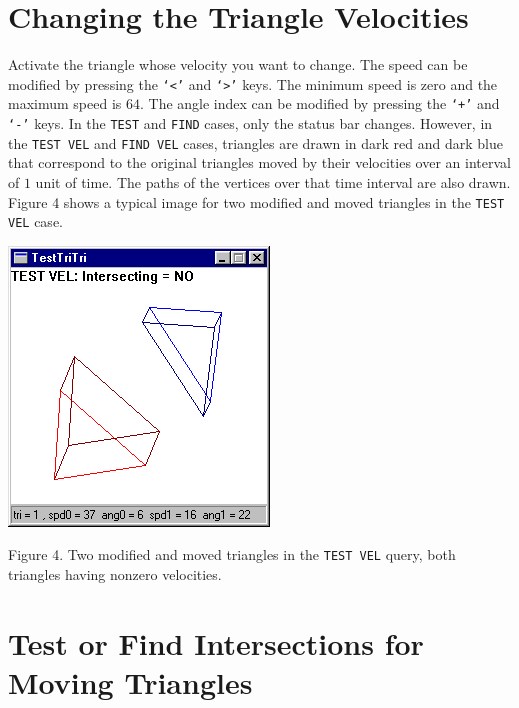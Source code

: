 \documentclass{article}
\newcommand{\Code}[1]{{\tt #1}}
\begin{document}
\section{Changing the Triangle Velocities}

Activate the triangle whose velocity you want to change.  The speed can be
modified by pressing the \Code{`<'} and \Code{`>'} keys.  The minimum speed
is zero and the maximum speed is $64$.  The angle index can be modified by
pressing the \Code{`+'} and \Code{`-'} keys.  In the \Code{TEST} and
\Code{FIND} cases, only the status bar changes.  However, in the
\Code{TEST VEL} and \Code{FIND VEL} cases, triangles are drawn in dark red
and dark blue that correspond to the original triangles moved by their
velocities over an interval of $1$ unit of time.  The paths of the vertices
over that time interval are also drawn.  Figure 4 shows a typical image for
two modified and moved triangles in the \Code{TEST VEL} case.
%
%
\begin{center}
  \includegraphics{Figure4.png}

  Figure 4.  Two modified and moved triangles in the \Code{TEST VEL} query,
  both triangles having nonzero velocities.
\end{center}

\section{Test or Find Intersections for Moving Triangles}
\end{document}
